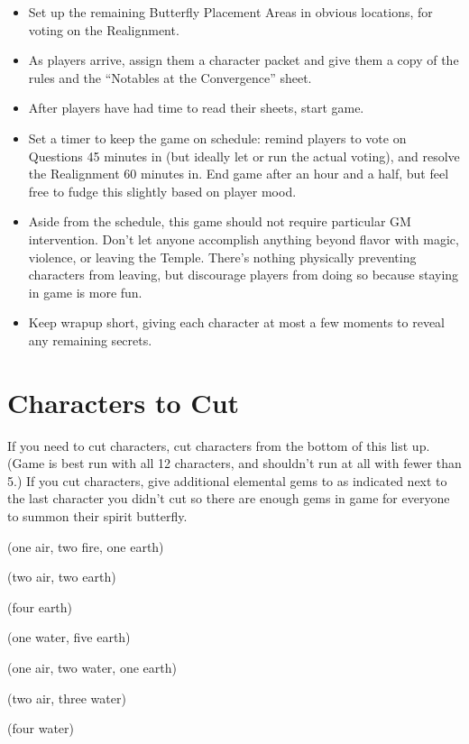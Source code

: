 \documentclass[sheet]{iron}
\begin{document}
\begin{itemize}
\item Set up the remaining Butterfly Placement Areas in obvious locations,
  for voting on the Realignment.
\item As players arrive, assign them a character packet and give them
  a copy of the rules and the ``Notables at the Convergence'' sheet.
\item After players have had time to read their sheets, start game.
\item Set a timer to keep the game on schedule: remind players to vote
  on Questions 45 minutes in (but ideally let \cRoyalty{\full} or
  \cFakePriest{\full} run the actual voting), and resolve the
  Realignment 60 minutes in.  End game after an hour and a half, but
  feel free to fudge this slightly based on player mood.
\item Aside from the schedule, this game should not require particular
  GM intervention.  Don't let anyone accomplish anything beyond flavor with
  magic, violence, or leaving the Temple.  There's nothing physically
  preventing characters from leaving, but discourage players from doing
  so because staying in game is more fun.
\item Keep wrapup short, giving each character at most a few moments to
reveal any remaining secrets.
\end{itemize}

\section{Characters to Cut}

If you need to cut characters, cut characters from the bottom of this list
up.  (Game is best run with all 12 characters, and shouldn't run at all
with fewer than 5.)  If you cut characters, give additional elemental gems to
\cRoyalty{\full} as indicated next to the last character you didn't cut
so there are enough gems in game for everyone
to summon their spirit butterfly.

\begin{enum}
\item \cRoyalty{\full}
\item \cMulan{\full}
\item \cGuildmaster{\full}
\item \cSpy{\full}
\item \cFakePriest{\full} (one air, two fire, one earth)
\item \cLieutenant{\full} (two air, two earth)
\item \cHotPerson{\full} (four earth)
\item \cRealPriest{\full} (one water, five earth)
\item \cServant{\full} (one air, two water, one earth)
\item \cPatriot{\full} (two air, three water)
\item \cBastard{\full} (four water)
\item \cTrickster{\full}
\end{enum}
\end{document}
